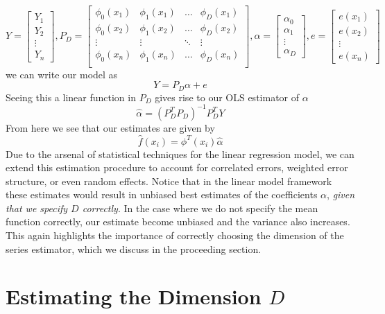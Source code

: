 \documentclass[12pt]{article}  %
\begin{document}
$$Y = \begin{bmatrix}Y_1\\ Y_2\\\vdots\\Y_n\end{bmatrix}, P_D = \begin{bmatrix}\phi_0(x_1) & \phi_1(x_1) & \ldots & \phi_{D}(x_1)\\\phi_0(x_2) & \phi_1(x_2) & \ldots & \phi_{D}(x_2)\\\vdots & \vdots & \ddots & \vdots \\\phi_0(x_n) & \phi_1(x_n) & \ldots & \phi_{D}(x_n)\\\end{bmatrix}, \alpha = \begin{bmatrix}\alpha_0\\\alpha_1 \\\vdots\\\alpha_D\end{bmatrix}, e =\begin{bmatrix}e(x_1)\\e(x_2)\\\vdots\\e(x_n)\end{bmatrix}$$ we can write our model as $$Y = P_D\alpha + e$$
Seeing this a linear function in $P_D$ gives rise to our OLS estimator of $\alpha$ $$\hat{\alpha} = (P_D^{T}P_D)^{-1}P_D^{T}Y$$ From here we see that our estimates are given by $$\hat{f}(x_i) = \phi^{T}(x_i)\hat{\alpha}$$
Due to the arsenal of statistical techniques for the linear regression model, we can extend this estimation procedure to account for correlated errors, weighted error structure, or even random effects. Notice that in the linear model framework these estimates would result in unbiased best estimates of the coefficients $\alpha$, \textit{given that we specify $D$ correctly}. In the case where we do not specify the mean function correctly, our estimate become unbiased and the variance also increases. This again highlights the importance of correctly choosing the dimension of the series estimator, which we discuss in the proceeding section. 
\section{Estimating the Dimension $D$}
\end{document}
